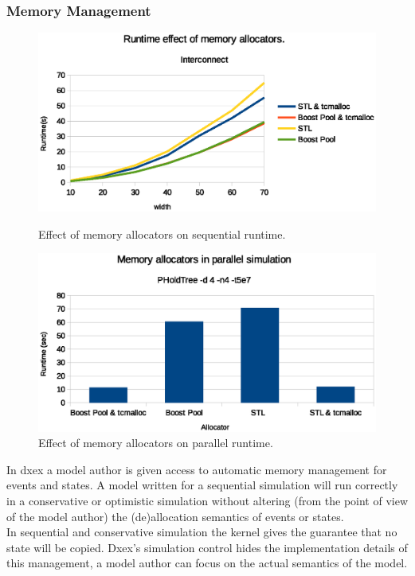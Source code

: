 \subsubsection{Memory Management}
\label{sec:4-subsec:overhead-pgraph:memory}
\begin{figure}
    \center

    \includegraphics[width=\modelfraction\columnwidth]{fig/memory_allocators.eps}
    \caption{Effect of memory allocators on sequential runtime.}
    \label{fig:memallocators}

    \includegraphics[width=\modelfraction\columnwidth]{fig/memory_allocators_parallel.eps}
    \caption{Effect of memory allocators on parallel runtime.}
    \label{fig:memallocators_parallel}
\end{figure}
In dxex a model author is given access to automatic memory management for events and states. A model written for a sequential simulation will run correctly in a conservative or optimistic simulation without altering (from the point of view of the model author) the (de)allocation semantics of events or states. \\
In sequential and conservative simulation the kernel gives the guarantee that no state will be copied. Dxex's simulation control hides the implementation details of this management, a model author can focus on the actual semantics of the model.
